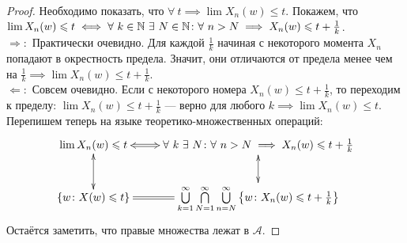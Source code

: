 \begin{proof}
    Необходимо показать, что $\forall ~ t \implies \lim X_n(w) \leq t$. Покажем, что $\lim X_n(w) \leqslant t
    \iff \forall ~ k \in \mathbb{N} ~ \exists ~ N \in \mathbb{N} \colon \forall ~ n > N \implies X_n(w) \leqslant t + \frac{1}{k}$.\\
    $\Rightarrow \colon$ Практически очевидно. Для каждой $\frac{1}{k}$ начиная с некоторого момента $X_n$ попадают
    в окрестность предела. Значит, они отличаются от предела менее чем на $\frac{1}{k} \implies \lim X_n(w) \leq t + \frac{1}{k}$.\\
    $\Leftarrow \colon$ Совсем очевидно. Если с некоторого номера $X_n(w) \leq t + \frac{1}{k}$, то переходим к пределу:
    $\lim X_n(w) \leq t + \frac{1}{k}$ --- верно для любого $k \implies \lim X_n(w) \leq t$.\\
    Перепишем теперь на языке теоретико-множественных операций:
    \[
        \xymatrix{
        {\lim X_n(w) \leq t}\ar@{<=>}[r]\ar@{<->}[d] & {\forall ~ k ~ \exists ~ N \colon \forall ~ n > N \implies X_n(w) \leq t + \frac{1}{k}}\ar@{<->}[d]\\
        {\{w \colon X(w) \leq t\}} \ar@{=}[r]& {\bigcup\limits_{k=1}^{\infty}\bigcap\limits_{N=1}^{\infty}\bigcup\limits_{n=N}^{\infty}
        \left\{w \colon X_n(w) \leq t + \frac{1}{k}\right\}}
        }
    \]
    Остаётся заметить, что правые множества лежат в $\mathcal{A}$.
\end{proof}

